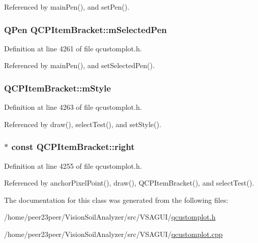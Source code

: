 Referenced by main\+Pen(), and set\+Pen().

\hypertarget{class_q_c_p_item_bracket_adcfb53602d1802d00e2de4fd6df6b291}{}
\subsubsection[{m\+Selected\+Pen}]{\setlength{\rightskip}{0pt plus 5cm}Q\+Pen Q\+C\+P\+Item\+Bracket\+::m\+Selected\+Pen\hspace{0.3cm}{\ttfamily [protected]}}\label{class_q_c_p_item_bracket_adcfb53602d1802d00e2de4fd6df6b291}


Definition at line 4261 of file qcustomplot.\+h.



Referenced by main\+Pen(), and set\+Selected\+Pen().

\hypertarget{class_q_c_p_item_bracket_ac911907184c824d621f274f8e0990080}{}
\subsubsection[{m\+Style}]{ Q\+C\+P\+Item\+Bracket\+::m\+Style\hspace{0.3cm}{\ttfamily [protected]}}\label{class_q_c_p_item_bracket_ac911907184c824d621f274f8e0990080}


Definition at line 4263 of file qcustomplot.\+h.



Referenced by draw(), select\+Test(), and set\+Style().

\hypertarget{class_q_c_p_item_bracket_afa6c1360b05a50c4e0df37b3cebab6be}{}
\subsubsection[{right}]{$\ast$ const Q\+C\+P\+Item\+Bracket\+::right}\label{class_q_c_p_item_bracket_afa6c1360b05a50c4e0df37b3cebab6be}


Definition at line 4255 of file qcustomplot.\+h.



Referenced by anchor\+Pixel\+Point(), draw(), Q\+C\+P\+Item\+Bracket(), and select\+Test().



The documentation for this class was generated from the following files\+:\begin{DoxyCompactItemize}
\item 
/home/peer23peer/\+Vision\+Soil\+Analyzer/src/\+V\+S\+A\+G\+U\+I/\hyperlink{qcustomplot_8h}{qcustomplot.\+h}\item 
/home/peer23peer/\+Vision\+Soil\+Analyzer/src/\+V\+S\+A\+G\+U\+I/\hyperlink{qcustomplot_8cpp}{qcustomplot.\+cpp}\end{DoxyCompactItemize}
